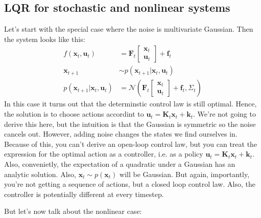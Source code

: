 \documentclass{report}
\begin{document}
\subsection{LQR for stochastic and nonlinear systems}
Let's start with the special case where the noise is multivariate Gaussian.
Then the system looks like this:
\begin{align}
f (\bm{x}_{t}, \bm{u}_{t} ) &= \bm{F}_{t} \begin{bmatrix} \bm{x}_{t} \\ \bm{u}_{t} \end{bmatrix} + \bm{f}_{t} \\
\bm{x}_{t+1} &\sim p (\bm{x}_{t+1}| \bm{x}_{t}, \bm{u}_{t}) \\
p (\bm{x}_{t+1}| \bm{x}_{t}, \bm{u}_{t}) &= 
\mathcal{N} \left( \bm{F}_{t} \begin{bmatrix} \bm{x}_{t} \\ \bm{u}_{t} \end{bmatrix} + \bm{f}_{t}, \Sigma_{ t }  \right) 
\end{align}
In this case it turns out that the determinstic control law is still optimal.
Hence, the solution is to choose actions accordint to $ \bm{u}_{t} = \bm{K}_{t}\bm{x}_{t} + \bm{k}_{t}  $.
We're not going to derive this here, 
but the intuition is that the Gaussian is symmetric so the noise cancels out.
However, adding noise changes the states we find ourselves in.
Because of this, you can't derive an open-loop control law, but you can treat
the expression for the optimal action as a controller, i.e. as a policy $ \bm{u}_{t} = \bm{K}_{t}\bm{x}_{t} + \bm{k}_{t}  $.
Also, convenietly, the expectation of a quadratic under a Gaussian has an analytic solution.
Also, $ \bm{x}_{t} \sim p (\bm{x}_{t})  $ will be Gaussian.
But again, importantly, you're not getting a sequence of actions, but a closed loop control law.
Also, the controller is potentially different at every timestep.

But let's now talk about the nonlinear case:
\end{document}
